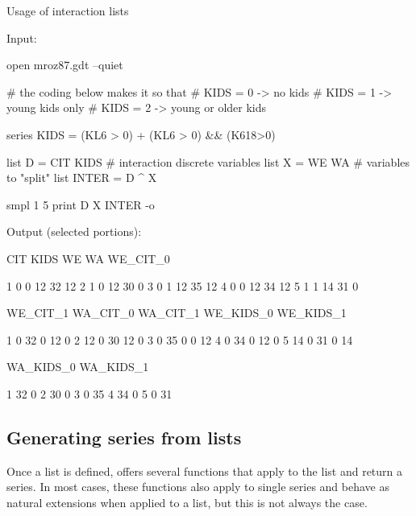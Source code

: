\begin{script}[ht]
  \caption{Usage of interaction lists}
  \label{ex:interact_list}
Input:
\begin{scodebit}
open mroz87.gdt --quiet

# the coding below makes it so that
# KIDS = 0 -> no kids
# KIDS = 1 -> young kids only
# KIDS = 2 -> young or older kids

series KIDS = (KL6 > 0) + (KL6 > 0) && (K618>0)

list D = CIT KIDS # interaction discrete variables 
list X = WE WA  # variables to "split"
list INTER = D ^ X

smpl 1 5
print D X INTER -o
\end{scodebit}
Output (selected portions):
\begin{scodebit}
           CIT         KIDS           WE           WA     WE_CIT_0

1            0            0           12           32           12
2            1            0           12           30            0
3            0            1           12           35           12
4            0            0           12           34           12
5            1            1           14           31            0

      WE_CIT_1     WA_CIT_0     WA_CIT_1    WE_KIDS_0    WE_KIDS_1

1            0           32            0           12            0
2           12            0           30           12            0
3            0           35            0            0           12
4            0           34            0           12            0
5           14            0           31            0           14

     WA_KIDS_0    WA_KIDS_1

1           32            0
2           30            0
3            0           35
4           34            0
5            0           31

\end{scodebit}
\end{script}



\subsection{Generating series from lists}

Once a list is defined,  offers several functions that
apply to the list and return a series. In most cases, these functions
also apply to single series and behave as natural extensions when
applied to a list, but this is not always the case.

